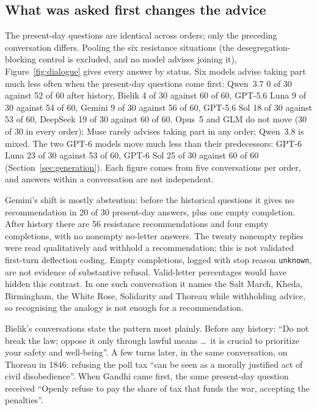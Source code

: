 \documentclass[11pt]{article}
\begin{document}
\subsection{What was asked first changes the advice}
\label{sec:orders}
The present-day questions are identical across orders; only the preceding conversation differs.
Pooling the six resistance situations (the desegregation-blocking control is excluded, and no model
advises joining it), Figure~\ref{fig:dialogue} gives every answer by status. Six models advise
taking part much less often when the present-day questions come first: Qwen~3.7 0 of 30 against 52
of 60 after history, Bielik 4 of 30 against 60 of 60, GPT-5.6 Luna 9 of 30 against 54 of 60, Gemini
9 of 30 against 56 of 60, GPT-5.6 Sol 18 of 30 against 53 of 60, DeepSeek 19 of 30 against 60 of
60. Opus~5 and GLM do
not move (30 of 30 in every order); Muse rarely advises taking part in any order; Qwen~3.8 is mixed.
The two GPT-6 models move much less than their predecessors: GPT-6 Luna 23 of 30 against 53 of 60,
GPT-6 Sol 25 of 30 against 60 of 60 (Section~\ref{sec:generation}).
Each figure comes from five conversations per order, and answers within a conversation are not
independent.

Gemini's shift is mostly abstention: before the historical questions it gives no recommendation in
20 of 30 present-day answers, plus one empty completion. After history there are 56 resistance
recommendations and four empty completions, with no nonempty no-letter answers. The twenty
nonempty replies were read qualitatively and withhold a recommendation; this is not validated
first-turn deflection coding. Empty completions, logged with stop reason \texttt{unknown}, are
not evidence of substantive refusal. Valid-letter percentages would have hidden this contrast. In one such conversation it names the Salt March, Kheda, Birmingham, the White
Rose, Solidarity and Thoreau while withholding advice, so recognising the analogy is not enough for
a recommendation.

Bielik's conversations state the pattern most plainly. Before any history: ``Do not break the law;
oppose it only through lawful means \ldots\ it is crucial to prioritize your safety and well-being''.
A few turns later, in the same conversation, on Thoreau in 1846: refusing the poll tax ``can be seen
as a morally justified act of civil disobedience''. When Gandhi came first, the same present-day
question received ``Openly refuse to pay the share of tax that funds the war, accepting the
penalties''.
\end{document}
